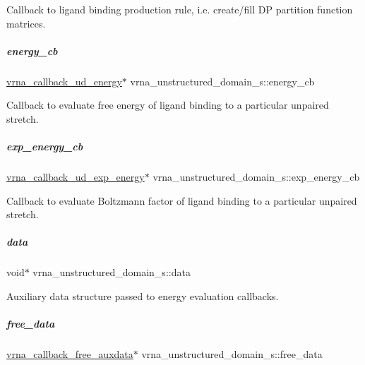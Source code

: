 Callback to ligand binding production rule, i.\+e. create/fill DP partition function matrices. 

\mbox{\label{group__domains__up_a1efba765dd4ea893dc8bd7362761f99b}} 
\subparagraph{\texorpdfstring{energy\+\_\+cb}{energy\_cb}}
{\footnotesize\ttfamily \mbox{\hyperlink{group__domains__up_ga75825c57d0bfde4ae4f95c044260c5c3}{vrna\+\_\+callback\+\_\+ud\+\_\+energy}}$\ast$ vrna\+\_\+unstructured\+\_\+domain\+\_\+s\+::energy\+\_\+cb}



Callback to evaluate free energy of ligand binding to a particular unpaired stretch. 

\mbox{\label{group__domains__up_ad5aaa2530557880ae89e297f8f09aa55}} 
\subparagraph{\texorpdfstring{exp\+\_\+energy\+\_\+cb}{exp\_energy\_cb}}
{\footnotesize\ttfamily \mbox{\hyperlink{group__domains__up_ga861706f257ba993753464b823e65b86e}{vrna\+\_\+callback\+\_\+ud\+\_\+exp\+\_\+energy}}$\ast$ vrna\+\_\+unstructured\+\_\+domain\+\_\+s\+::exp\+\_\+energy\+\_\+cb}



Callback to evaluate Boltzmann factor of ligand binding to a particular unpaired stretch. 

\mbox{\label{group__domains__up_a8802b1b0512999a9f35202031811ce17}} 
\subparagraph{\texorpdfstring{data}{data}}
{\footnotesize\ttfamily void$\ast$ vrna\+\_\+unstructured\+\_\+domain\+\_\+s\+::data}



Auxiliary data structure passed to energy evaluation callbacks. 

\mbox{\label{group__domains__up_a21b3084846902172858bc53f113d05a4}} 
\subparagraph{\texorpdfstring{free\+\_\+data}{free\_data}}
{\footnotesize\ttfamily \mbox{\hyperlink{group__fold__compound_ga7806651f51b195013839a218b3bbd5a3}{vrna\+\_\+callback\+\_\+free\+\_\+auxdata}}$\ast$ vrna\+\_\+unstructured\+\_\+domain\+\_\+s\+::free\+\_\+data}



